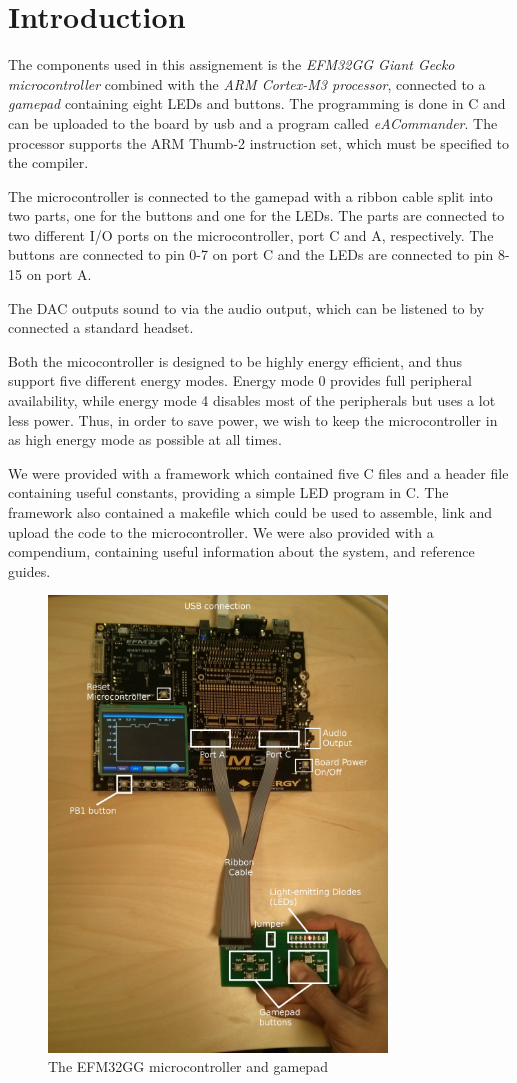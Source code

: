 \section{Introduction}

The components used in this assignement is the \textit{EFM32GG Giant Gecko microcontroller} combined with
the \textit{ARM Cortex-M3 processor}, connected to a \textit{gamepad} containing eight LEDs and buttons. The programming
is done in C and can be uploaded to the board by usb and a program called \textit{eACommander}. The processor supports the ARM Thumb-2 instruction set, which must be specified to the compiler. 

The microcontroller is connected to the gamepad with a ribbon cable split into two parts, one for the buttons and one for the LEDs. The parts are connected to two different I/O ports on the microcontroller, port C and A, respectively. The buttons are connected to pin 0-7 on port C and the LEDs are connected to pin 8-15 on port A. 

The DAC outputs sound to via the audio output, which can be listened to by connected a standard headset. 


Both the micocontroller is designed to be highly energy efficient, and thus support five different energy modes. Energy mode 0 provides full peripheral availability, while energy mode 4 disables most of the peripherals but uses a lot less power. Thus, in order to save power, we wish to keep the microcontroller in as high energy mode as possible at all times. 

We were provided with a framework which contained five C files and a header file containing useful constants, providing a simple LED program in C. The framework also contained a makefile which could be used to assemble, link and upload the code to the microcontroller. We were also provided with a compendium\cite{compendium}, containing useful information about the system, and reference guides\cite{cortex}\cite{efm32gg}.

\begin{figure}[ht]
    \centering
      \includegraphics[width=9cm]{figures/efm32gg}
    \caption{The EFM32GG microcontroller and gamepad\cite{compendium}}
    \label{figure_ef32gg}
\end{figure}

